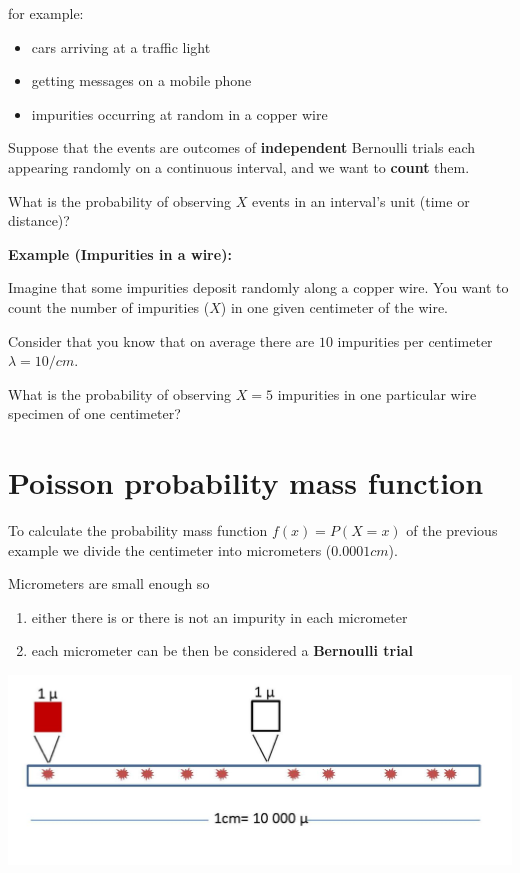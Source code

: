 \documentclass[
]{book}
\providecommand{\tightlist}{%
  \setlength{\itemsep}{0pt}\setlength{\parskip}{0pt}}
\begin{document}
for example:

\begin{itemize}
\tightlist
\item
  cars arriving at a traffic light
\item
  getting messages on a mobile phone
\item
  impurities occurring at random in a copper wire
\end{itemize}

Suppose that the events are outcomes of \textbf{independent} Bernoulli trials each appearing randomly on a continuous interval, and we want to \textbf{count} them.

What is the probability of observing \(X\) events in an interval's unit (time or distance)?

\textbf{Example (Impurities in a wire):}

Imagine that some impurities deposit randomly along a copper wire. You want to count the number of impurities (\(X\)) in one given centimeter of the wire.

Consider that you know that on average there are \(10\) impurities per centimeter \(\lambda=10/cm\).

What is the probability of observing \(X=5\) impurities in one particular wire specimen of one centimeter?

\hypertarget{poisson-probability-mass-function}{%
\section{Poisson probability mass function}\label{poisson-probability-mass-function}}

To calculate the probability mass function \(f(x)=P(X=x)\) of the previous example we divide the centimeter into micrometers (\(0.0001cm\)).

Micrometers are small enough so

\begin{enumerate}
\def\labelenumi{\arabic{enumi})}
\item
  either there is or there is not an impurity in each micrometer
\item
  each micrometer can be then be considered a \textbf{Bernoulli trial}
\end{enumerate}

\includegraphics{./figures/Pois.JPG}
\end{document}
